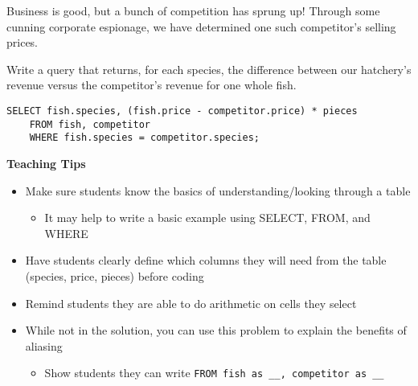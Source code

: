 \begin{blocksection}
\question Business is good, but a bunch of competition has sprung up! Through some cunning corporate espionage, we have determined one such competitor's selling prices.

Write a query that returns, for each species, the difference between our hatchery's revenue versus the competitor's revenue for one whole fish.


\begin{solution}[1.5in]
\begin{lstlisting}
SELECT fish.species, (fish.price - competitor.price) * pieces
    FROM fish, competitor
    WHERE fish.species = competitor.species;
\end{lstlisting}
\end{solution}
\end{blocksection}

\begin{blocksection}
\begin{guide}
\textbf{Teaching Tips}
\begin{itemize}
  \item Make sure students know the basics of understanding/looking through a table
  \begin{itemize}
    \item It may help to write a basic example using SELECT, FROM, and WHERE
  \end{itemize}
  \item Have students clearly define which columns they will need from the table (species, price, pieces) before coding
  \item Remind students they are able to do arithmetic on cells they select
  \item While not in the solution, you can use this problem to explain the benefits of aliasing
  \begin{itemize}
    \item Show students they can write \lstinline{FROM fish as __, competitor as __}
  \end{itemize}
\end{itemize}
\end{guide}
\end{blocksection}
